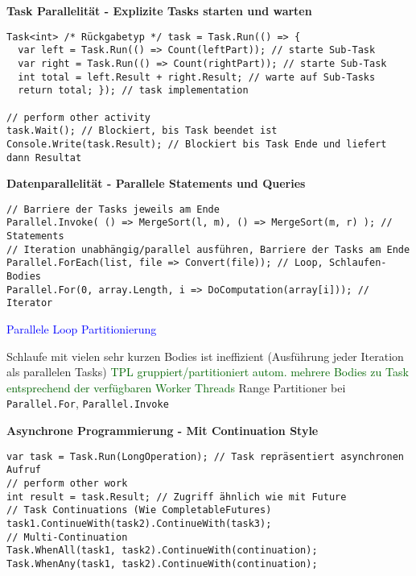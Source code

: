 \textbf{Task Parallelität - Explizite Tasks starten und warten}
\begin{lstlisting}
Task<int> /* Rückgabetyp */ task = Task.Run(() => {
  var left = Task.Run(() => Count(leftPart)); // starte Sub-Task
  var right = Task.Run(() => Count(rightPart)); // starte Sub-Task
  int total = left.Result + right.Result; // warte auf Sub-Tasks
  return total; }); // task implementation

// perform other activity
task.Wait(); // Blockiert, bis Task beendet ist
Console.Write(task.Result); // Blockiert bis Task Ende und liefert dann Resultat
\end{lstlisting}

\textbf{Datenparallelität - Parallele Statements und Queries }
\begin{lstlisting}
// Barriere der Tasks jeweils am Ende
Parallel.Invoke( () => MergeSort(l, m), () => MergeSort(m, r) ); // Statements
// Iteration unabhängig/parallel ausführen, Barriere der Tasks am Ende
Parallel.ForEach(list, file => Convert(file)); // Loop, Schlaufen-Bodies
Parallel.For(0, array.Length, i => DoComputation(array[i])); // Iterator
\end{lstlisting}

\textcolor{blue}{Parallele Loop Partitionierung}

Schlaufe mit vielen sehr kurzen Bodies ist ineffizient (Ausführung jeder Iteration als parallelen Tasks) \textcolor{darkGreen}{TPL gruppiert/partitioniert autom. mehrere Bodies zu Task entsprechend der verfügbaren Worker Threads} Range Partitioner bei \lstinline{Parallel.For}, \lstinline{Parallel.Invoke}

%
%

\textbf{Asynchrone Programmierung - Mit Continuation Style}

\begin{lstlisting}
var task = Task.Run(LongOperation); // Task repräsentiert asynchronen Aufruf
// perform other work
int result = task.Result; // Zugriff ähnlich wie mit Future
// Task Continuations (Wie CompletableFutures)
task1.ContinueWith(task2).ContinueWith(task3);
// Multi-Continuation
Task.WhenAll(task1, task2).ContinueWith(continuation);
Task.WhenAny(task1, task2).ContinueWith(continuation);
\end{lstlisting}
